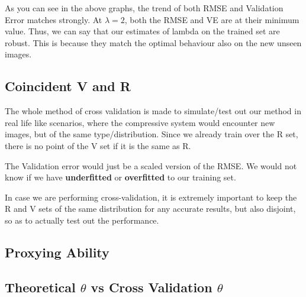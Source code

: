 \documentclass[a4paper,14pt]{article}
\numberwithin{definition}{section}
\numberwithin{mytheorem}{subsection}
\begin{document}
As you can see in the above graphs, the trend of both RMSE and Validation Error matches strongly. At $\lambda=2$, both the RMSE and VE are at their minimum value. Thus, we can say that our estimates of lambda on the trained set are robust. This is because they match the optimal behaviour also on the new unseen images.

\subsection{Coincident V and R}

The whole method of cross validation is made to simulate/test out our method in real life like scenarios, where the compressive system would encounter new images, but of the same type/distribution. Since we already train over the R set, there is no point of the V set if it is the same as R.

The Validation error would just be a scaled version of the RMSE. We would not know if we have \textbf{underfitted} or \textbf{overfitted} to our training set.

In case we are performing cross-validation, it is extremely important to keep the R and V sets of the same distribution for any accurate results, but also disjoint, so as to actually test out the performance.

\subsection{Proxying Ability}




\subsection{Theoretical $\theta$ vs Cross Validation $\theta$}
\end{document}
